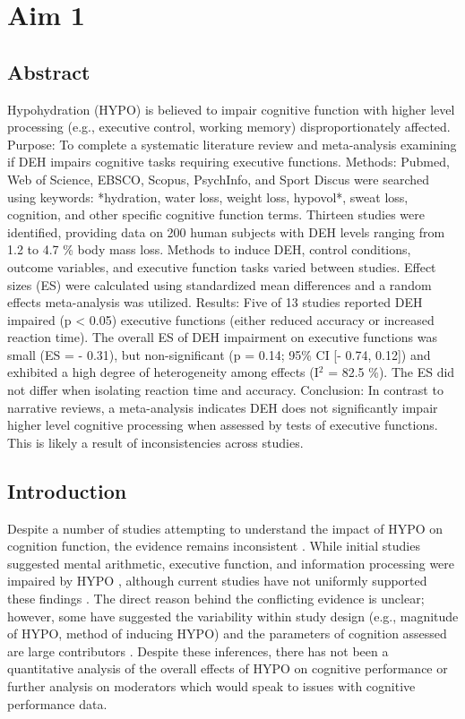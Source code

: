\chapter{Aim 1}

\section{Abstract}
Hypohydration (HYPO) is believed to impair cognitive function with higher level processing (e.g., executive control, working memory) disproportionately affected. Purpose: To complete a systematic literature review and meta-analysis examining if DEH impairs cognitive tasks requiring executive functions. Methods: Pubmed, Web of Science, EBSCO, Scopus, PsychInfo, and Sport Discus were searched using keywords: *hydration, water loss, weight loss, hypovol*, sweat loss, cognition, and other specific cognitive function terms.  Thirteen studies were identified, providing data on 200 human subjects with DEH levels ranging from 1.2 to 4.7 \% body mass loss. Methods to induce DEH, control conditions, outcome variables, and executive function tasks varied between studies. Effect sizes (ES) were calculated using standardized mean differences and a random effects meta-analysis was utilized.  Results: Five of 13 studies reported DEH impaired (p < 0.05) executive functions (either reduced accuracy or increased reaction time). The overall ES of DEH impairment on executive functions was small (ES = - 0.31), but non-significant (p = 0.14; 95\% CI [- 0.74, 0.12]) and exhibited a high degree of heterogeneity among effects (I${^2}$ = 82.5 \%). The ES did not differ when isolating reaction time and accuracy. Conclusion: In contrast to narrative reviews, a meta-analysis indicates DEH does not significantly impair higher level cognitive processing when assessed by tests of executive functions. This is likely a result of inconsistencies across studies.

\section{Introduction}
Despite a number of studies attempting to understand the impact of HYPO on cognition function, the evidence remains inconsistent \cite{grandjean_dehydration_2007,masento_effects_2014,lieberman_hydration_2007,wilson_impaired_2003}. While initial studies suggested mental arithmetic, executive function, and information processing were impaired by HYPO \cite{gopinathan_role_1988, sharma_influence_1986}, although current studies have not uniformly supported these findings \cite{adam_hydration_2008, ely_hypohydration_2013}. The direct reason behind the conflicting evidence is unclear; however, some have suggested the variability within study design (e.g., magnitude of HYPO, method of inducing HYPO) and the parameters of cognition assessed are large contributors \cite{lieberman_hydration_2007, lieberman_methods_2012,masento_effects_2014}. Despite these inferences, there has not been a quantitative analysis of the overall effects of HYPO on cognitive performance or further analysis on moderators which would speak to issues with cognitive performance data. 

